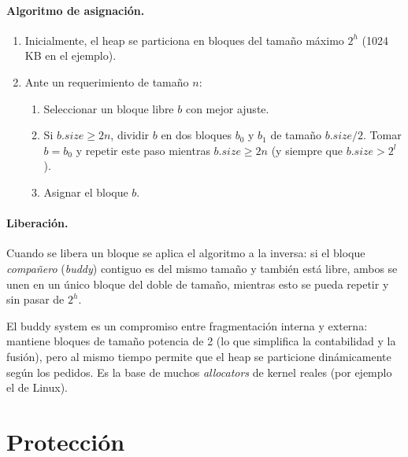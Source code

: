 \documentclass[11pt,a4paper]{article}
\begin{document}
\paragraph{Algoritmo de asignación.}
\begin{enumerate}[leftmargin=*]
    \item Inicialmente, el heap se particiona en bloques del tamaño
        máximo $2^h$ (1024\,KB en el ejemplo).
    \item Ante un requerimiento de tamaño $n$:
        \begin{enumerate}[leftmargin=*,label=\arabic*.]
            \item Seleccionar un bloque libre $b$ con mejor ajuste.
            \item Si $b.\textit{size} \geq 2n$, dividir $b$ en dos
                bloques $b_0$ y $b_1$ de tamaño $b.\textit{size}/2$.
                Tomar $b = b_0$ y repetir este paso mientras
                $b.\textit{size} \geq 2n$ (y siempre que
                $b.\textit{size} > 2^l$).
            \item Asignar el bloque $b$.
        \end{enumerate}
\end{enumerate}

\paragraph{Liberación.}
Cuando se libera un bloque se aplica el algoritmo a la inversa: si el
bloque \emph{compañero} (\emph{buddy}) contiguo es del mismo tamaño y
también está libre, ambos se unen en un único bloque del doble de
tamaño, mientras esto se pueda repetir y sin pasar de $2^h$.

\begin{importante}
El buddy system es un compromiso entre fragmentación interna y externa:
mantiene bloques de tamaño potencia de 2 (lo que simplifica la
contabilidad y la fusión), pero al mismo tiempo permite que el heap se
particione dinámicamente según los pedidos. Es la base de muchos
\emph{allocators} de kernel reales (por ejemplo el de Linux).
\end{importante}

\section{Protección}
\end{document}
